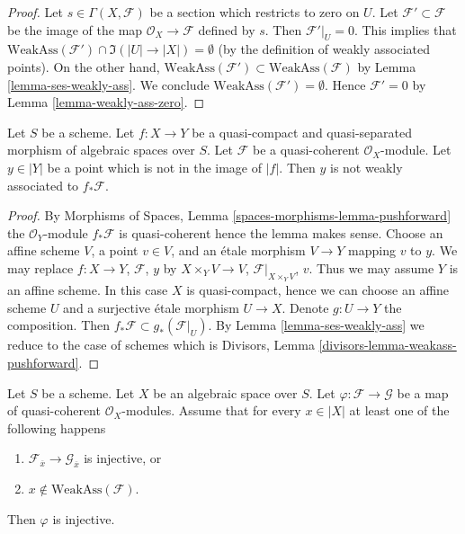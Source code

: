 \begin{proof}
Let $s \in \Gamma(X, \mathcal{F})$ be a section which restricts to zero on $U$.
Let $\mathcal{F}' \subset \mathcal{F}$ be the image of the map
$\mathcal{O}_X \to \mathcal{F}$ defined by $s$. Then $\mathcal{F}'|_U = 0$.
This implies that
$\text{WeakAss}(\mathcal{F}') \cap \Im(|U| \to |X|) = \emptyset$
(by the definition of weakly associated points).
On the other hand,
$\text{WeakAss}(\mathcal{F}') \subset \text{WeakAss}(\mathcal{F})$
by Lemma \ref{lemma-ses-weakly-ass}. We conclude
$\text{WeakAss}(\mathcal{F}') = \emptyset$.
Hence $\mathcal{F}' = 0$ by Lemma \ref{lemma-weakly-ass-zero}.
\end{proof}

\begin{lemma}
\label{lemma-weakass-pushforward}
Let $S$ be a scheme. Let $f : X \to Y$ be a quasi-compact and quasi-separated
morphism of algebraic spaces over $S$. Let $\mathcal{F}$ be a quasi-coherent
$\mathcal{O}_X$-module. Let $y \in |Y|$ be a point which is not in the
image of $|f|$. Then $y$ is not weakly associated to $f_*\mathcal{F}$.
\end{lemma}

\begin{proof}
By Morphisms of Spaces, Lemma \ref{spaces-morphisms-lemma-pushforward}
the $\mathcal{O}_Y$-module $f_*\mathcal{F}$ is quasi-coherent hence
the lemma makes sense.
Choose an affine scheme $V$, a point $v \in V$, and an \'etale morphism
$V \to Y$ mapping $v$ to $y$. We may replace
$f : X \to Y$, $\mathcal{F}$, $y$ by
$X \times_Y V \to V$, $\mathcal{F}|_{X \times_Y V}$, $v$.
Thus we may assume $Y$ is an affine scheme.
In this case $X$ is quasi-compact, hence we can choose
an affine scheme $U$ and a surjective \'etale morphism $U \to X$.
Denote $g : U \to Y$ the composition.
Then $f_*\mathcal{F} \subset g_*(\mathcal{F}|_U)$.
By Lemma \ref{lemma-ses-weakly-ass}
we reduce to the case of schemes which is
Divisors, Lemma \ref{divisors-lemma-weakass-pushforward}.
\end{proof}

\begin{lemma}
\label{lemma-check-injective-on-weakass}
Let $S$ be a scheme. Let $X$ be an algebraic space over $S$.
Let $\varphi : \mathcal{F} \to \mathcal{G}$ be a map of
quasi-coherent $\mathcal{O}_X$-modules. Assume that for every
$x \in |X|$ at least one of the following happens
\begin{enumerate}
\item $\mathcal{F}_{\overline{x}} \to \mathcal{G}_{\overline{x}}$
is injective, or
\item $x \not \in \text{WeakAss}(\mathcal{F})$.
\end{enumerate}
Then $\varphi$ is injective.
\end{lemma}

